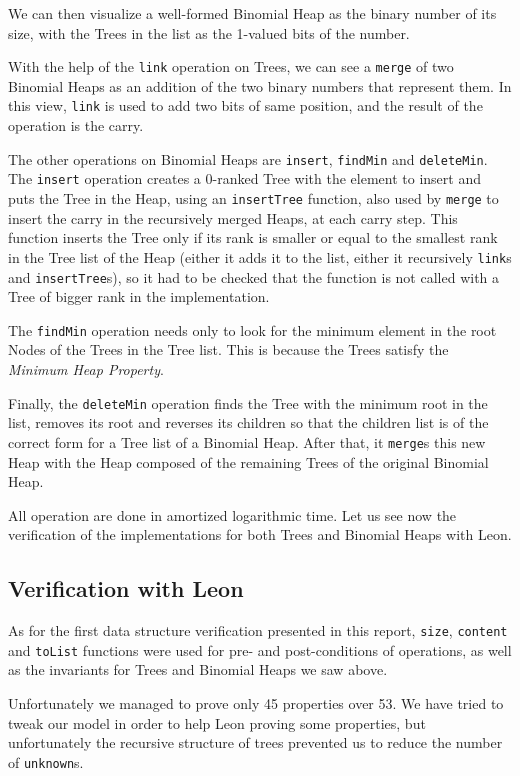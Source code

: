 We can then visualize a well-formed Binomial Heap as the binary number of its size, 
with the Trees in the list as the 1-valued bits of the number.

With the help of the \verb|link| operation on Trees, 
we can see a \verb|merge| of two Binomial Heaps 
as an addition of the two binary numbers that represent them.
In this view, \verb|link| is used to add two bits of same position,
and the result of the operation is the carry.

The other operations on Binomial Heaps are \verb|insert|, \verb|findMin| and \verb|deleteMin|. 
The \verb|insert| operation creates a 0-ranked Tree with the element to insert 
and puts the Tree in the Heap, using an \verb|insertTree| function, 
also used by \verb|merge| to insert the carry in the recursively merged Heaps,
at each carry step.
This function inserts the Tree only if its rank is smaller or equal to the smallest rank in the Tree list of the Heap 
(either it adds it to the list, either it recursively \verb|link|s and \verb|insertTree|s),
so it had to be checked that the function is not called with a Tree of bigger rank in the implementation.

The \verb|findMin| operation needs only to look for the minimum element 
in the root Nodes of the Trees in the Tree list.
This is because the Trees satisfy the \emph{Minimum Heap Property}.

Finally, the \verb|deleteMin| operation finds the Tree with the minimum root in the list,
removes its root 
and reverses its children so that the children list is of the correct form for a Tree list of a Binomial Heap.
After that, it \verb|merge|s this new Heap with the Heap composed of 
the remaining Trees of the original Binomial Heap.

All operation are done in amortized logarithmic time.
Let us see now the verification of the implementations 
for both Trees and Binomial Heaps with Leon.

\subsection{Verification with Leon}
As for the first data structure verification presented in this report,
 \verb|size|, \verb|content| and \verb|toList| functions were used
 for pre- and post-conditions of operations,
as well as the invariants for Trees and Binomial Heaps we saw above.

Unfortunately we managed to prove only 45 properties over 53. 
We have tried to tweak our model in order to help Leon proving some properties,
but unfortunately the recursive structure of trees prevented us to reduce the number of \verb|unknown|s.

